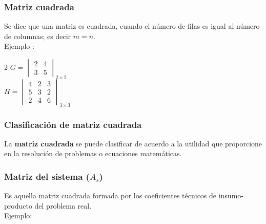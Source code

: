 \documentclass[12pt, a5paper]{article}
\begin{document}
\subsubsection*{Matriz cuadrada}
\noindent Se dice que una matriz es cuadrada, cuando el número de filas es igual al número de columnas; es decir $m = n$. \\

\noindent Ejemplo :

\begin{multicols}{2}
$G = \begin{vmatrix}
2 & 4 \\
3 & 5
\end{vmatrix}_{2 \times 2}$ \\

$H = \begin{vmatrix} 4 & 2 & 3 \\  5 & 3 & 2 \\ 2 & 4 & 6 \end{vmatrix}_{3 \times 3}$
\end{multicols}


\subsubsection*{Clasificación de matriz cuadrada}
La \textbf{matriz cuadrada} se puede clasificar de acuerdo a la utilidad que proporcione en la resolución de problemas o ecuaciones matemáticas. \\



\subsubsection*{Matriz del sistema ({\Large $A_s$})}
\noindent Es aquella matriz cuadrada formada por los coeficientes técnicos de insumo-producto del problema real. \\

\noindent Ejemplo:
\end{document}
